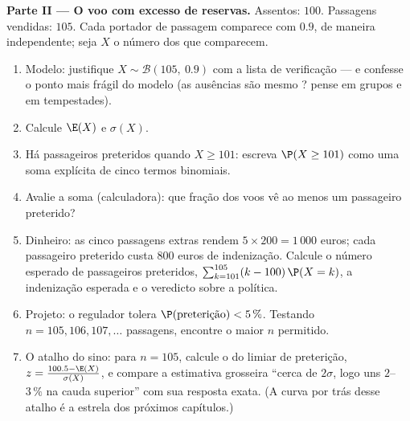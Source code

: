 \begin{problem}
\medskip
\noindent\textbf{Parte II --- O voo com excesso de reservas.}
Assentos: $100$. Passagens vendidas: $105$. Cada portador de
passagem comparece com  $0.9$, de maneira
independente; seja $X$ o número dos que comparecem.
\begin{enumerate}[resume]
  \item Modelo: justifique $X \sim \mathcal B(105,\ 0.9)$ com a
        lista de verificação --- e confesse o ponto mais frágil
        do modelo (as ausências são mesmo ? pense
        em grupos e em tempestades).
  \item Calcule $\E(X)$ e $\sigma(X)$.
  \item Há passageiros preteridos quando $X \geq 101$: escreva
        $\P(X \geq 101)$ como uma soma explícita de cinco
        termos binomiais.
  \item Avalie a soma (calculadora): que fração dos voos vê ao
        menos um passageiro preterido?
  \item Dinheiro: as cinco passagens extras rendem
        $5 \times 200 = 1\,000$ euros; cada passageiro preterido
        custa $800$ euros de indenização. Calcule o número
        esperado de passageiros preteridos,
        $\sum_{k=101}^{105} (k - 100)\,\P(X = k)$, a indenização
        esperada e o veredicto sobre a política.
  \item Projeto: o regulador tolera
        $\P(\text{preterição}) < 5\,\%$. Testando
        $n = 105, 106, 107, \dots$ passagens, encontre o maior
        $n$ permitido.
  \item O atalho do sino: para $n = 105$, calcule o 
        do limiar de preterição,
        $z = \frac{100.5 - \E(X)}{\sigma(X)}$, e compare a
        estimativa grosseira ``cerca de $2\sigma$, logo uns
        $2$--$3\,\%$ na cauda superior'' com sua resposta
        exata. (A curva por trás desse atalho é a estrela dos
        próximos capítulos.)
\end{enumerate}


\end{problem}
